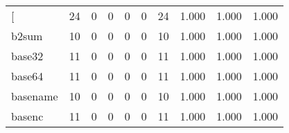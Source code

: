 \begin{longtable}{lp{1.3cm}p{1.3cm}p{1.3cm}p{1.3cm}p{1.3cm}p{1.3cm}p{1.3cm}p{1.3cm}p{1.3cm}}
\bottomrule
\endlastfoot
{[}         &                     24 &                                             0 &                                            0 &                                           0 &                                            0 &                                         24 &                                1.000 &                                  1.000 &                                1.000 \\
b2sum     &                     10 &                                             0 &                                            0 &                                           0 &                                            0 &                                         10 &                                1.000 &                                  1.000 &                                1.000 \\
base32    &                     11 &                                             0 &                                            0 &                                           0 &                                            0 &                                         11 &                                1.000 &                                  1.000 &                                1.000 \\
base64    &                     11 &                                             0 &                                            0 &                                           0 &                                            0 &                                         11 &                                1.000 &                                  1.000 &                                1.000 \\
basename  &                     10 &                                             0 &                                            0 &                                           0 &                                            0 &                                         10 &                                1.000 &                                  1.000 &                                1.000 \\
basenc    &                     11 &                                             0 &                                            0 &                                           0 &                                            0 &                                         11 &                                1.000 &                                  1.000 &                                1.000 \\

\end{longtable}
